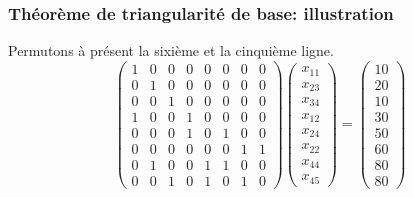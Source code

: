 \documentclass[usepdftitle=false, aspectratio=169]{beamer}
\begin{document}
\begin{frame}
\frametitle{Théorème de triangularité de base: illustration}

Permutons à présent la sixième et la cinquième ligne.
\[
\begin{pmatrix}
 1 & 0 & 0 & 0 & 0 & 0 & 0 & 0 \\
 0 & 1 & 0 & 0 & 0 & 0 & 0 & 0 \\
 0 & 0 & 1 & 0 & 0 & 0 & 0 & 0 \\
 1 & 0 & 0 & 1 & 0 & 0 & 0 & 0 \\
 0 & 0 & 0 & 1 & 0 & 1 & 0 & 0 \\
 0 & 0 & 0 & 0 & 0 & 0 & 1 & 1 \\
 0 & 1 & 0 & 0 & 1 & 1 & 0 & 0 \\
 0 & 0 & 1 & 0 & 1 & 0 & 1 & 0
\end{pmatrix}
\begin{pmatrix}
x_{11} \\
x_{23} \\
x_{34} \\
x_{12} \\
x_{24} \\
x_{22} \\
x_{44} \\
x_{45}
\end{pmatrix}
=
\begin{pmatrix}
10 \\
20 \\
10 \\
30 \\
50 \\
60 \\
80 \\
80
\end{pmatrix}
\]

\end{frame}
\end{document}
